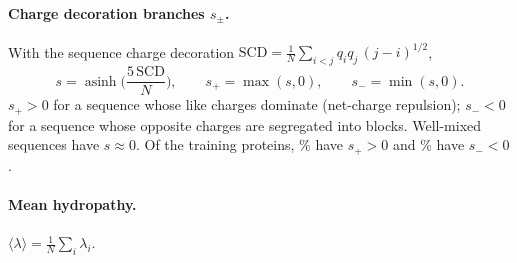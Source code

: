 \documentclass[11pt]{article}
\newcommand{\lam}{\langle\lambda\rangle}
\begin{document}
\paragraph{Charge decoration branches $s_\pm$.} With the sequence charge decoration
$\mathrm{SCD}=\frac1N\sum_{i<j}q_iq_j\,(j-i)^{1/2}$,
\begin{equation}
s=\operatorname{asinh}\!\Big(\frac{5\,\mathrm{SCD}}{N}\Big),\qquad s_+=\max(s,0),\qquad s_-=\min(s,0).
\end{equation}
$s_+>0$ for a sequence whose like charges dominate (net-charge repulsion); $s_-<0$ for a sequence whose opposite
charges are segregated into blocks. Well-mixed sequences have $s\approx0$. Of the training proteins, \% have
$s_+>0$ and \% have $s_-<0$.

\paragraph{Mean hydropathy.} $\lam=\frac1N\sum_i\lambda_i$.
\end{document}
